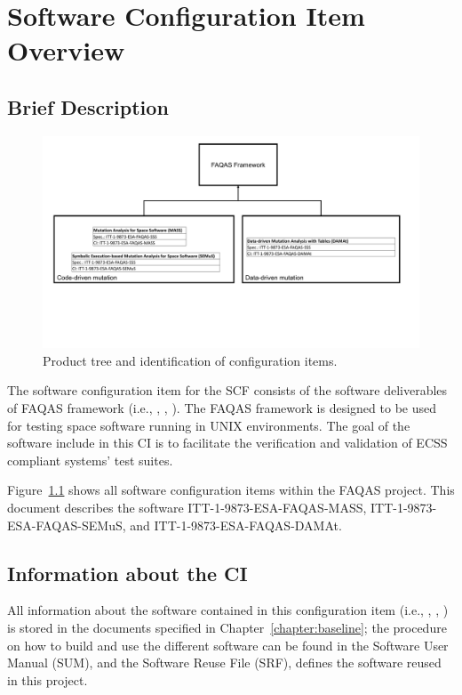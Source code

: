 
\chapter{Software Configuration Item Overview}

\section{Brief Description}

\begin{figure}[t]
  \centering
	\includegraphics[width=\textwidth]{images/CI_tree.pdf}
      \caption{Product tree and identification of configuration items.}
      \label{fig:ci:tree}
\end{figure}


The software configuration item for the SCF consists of the software deliverables of FAQAS framework (i.e., \MASS, \SEMUS, \DAMA). The FAQAS framework is designed to be used for testing space software running in UNIX environments. The goal of the software include in this CI is to facilitate the verification and validation of ECSS compliant systems' test suites.

Figure~\ref{fig:ci:tree} shows all software configuration items within the FAQAS project. This document describes the software ITT-1-9873-ESA-FAQAS-MASS, ITT-1-9873-ESA-FAQAS-SEMuS, and ITT-1-9873-ESA-FAQAS-DAMAt.

\section{Information about the CI}

All information about the software contained in this configuration item (i.e., \MASS, \SEMUS, \DAMA) is stored in the documents specified in Chapter~\ref{chapter:baseline}; the procedure on how to build and use the different software can be found in the Software User Manual (SUM), and the Software Reuse File (SRF), defines the software reused in this project.

